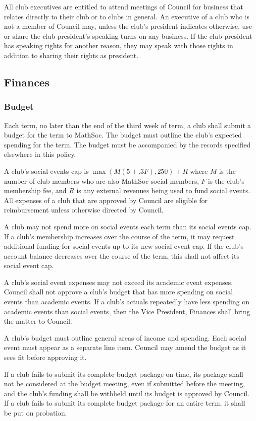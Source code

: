 All club executives are entitled to attend meetings of Council for business that
relates directly to their club or to clubs in general. An executive of a club
who is not a member of Council may, unless the club's president indicates
otherwise, use or share the club president's speaking turns on any business. If
the club president has speaking rights for another reason, they may speak with
those rights in addition to sharing their rights as president.

\subsection{Finances}
\subsubsection{Budget}
Each term, no later than the end of the third week of term, a club shall submit
a budget for the term to MathSoc. The budget must outline the club's expected
spending for the term. The budget must be accompanied by the records specified
elsewhere in this policy.

A club's social events cap is $\max(M(5 + .3F), 250) + R$ where $M$ is the
number of club members who are also MathSoc social members, $F$ is the
club's membership fee, and $R$ is any external revenues being used to fund
social events. All expenses of a club that are approved by Council are
eligible for reimbursement unless otherwise directed by Council.

A club may not spend more on social events each term than its social events cap.
If a club's membership increases over the course of the term, it may request
additional funding for social events up to its new social event cap. If the
club's account balance decreases over the course of the term, this shall not
affect its social event cap.

A club's social event expenses may not exceed its academic event expenses.
Council shall not approve a club's budget that has more spending on social
events than academic events. If a club's actuals repeatedly have less spending
on academic events than social events, then the Vice President, Finances shall
bring the matter to Council.


A club's budget must outline general areas of income and spending. Each social
event must appear as a separate line item. Council may amend the budget as it
sees fit before approving it.

If a club fails to submit its complete budget package on time, its package shall
not be considered at the budget meeting, even if submitted before the meeting,
and the club's funding shall be withheld until its budget is approved by
Council. If a club fails to submit its complete budget package for an entire
term, it shall be put on probation.

